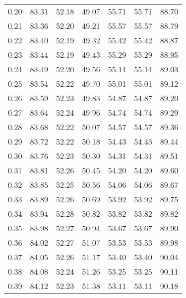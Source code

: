 \begin{tabular}{|c|c|c|c|c|c|c|}
      0.20 &     83.31 &     52.18 &      49.07 &   55.71 &      55.71 &         88.70 \\
      0.21 &     83.36 &     52.20 &      49.21 &   55.57 &      55.57 &         88.79 \\
      0.22 &     83.40 &     52.19 &      49.32 &   55.42 &      55.42 &         88.87 \\
      0.23 &     83.44 &     52.19 &      49.43 &   55.29 &      55.29 &         88.95 \\
      0.24 &     83.49 &     52.20 &      49.56 &   55.14 &      55.14 &         89.03 \\
      0.25 &     83.54 &     52.22 &      49.70 &   55.01 &      55.01 &         89.12 \\
      0.26 &     83.59 &     52.23 &      49.83 &   54.87 &      54.87 &         89.20 \\
      0.27 &     83.64 &     52.24 &      49.96 &   54.74 &      54.74 &         89.29 \\
      0.28 &     83.68 &     52.22 &      50.07 &   54.57 &      54.57 &         89.36 \\
      0.29 &     83.72 &     52.22 &      50.18 &   54.43 &      54.43 &         89.44 \\
      0.30 &     83.76 &     52.23 &      50.30 &   54.31 &      54.31 &         89.51 \\
      0.31 &     83.81 &     52.26 &      50.45 &   54.20 &      54.20 &         89.60 \\
      0.32 &     83.85 &     52.25 &      50.56 &   54.06 &      54.06 &         89.67 \\
      0.33 &     83.89 &     52.26 &      50.69 &   53.92 &      53.92 &         89.75 \\
      0.34 &     83.94 &     52.28 &      50.82 &   53.82 &      53.82 &         89.82 \\
      0.35 &     83.98 &     52.27 &      50.94 &   53.67 &      53.67 &         89.90 \\
      0.36 &     84.02 &     52.27 &      51.07 &   53.53 &      53.53 &         89.98 \\
      0.37 &     84.05 &     52.26 &      51.17 &   53.40 &      53.40 &         90.04 \\
      0.38 &     84.08 &     52.24 &      51.26 &   53.25 &      53.25 &         90.11 \\
      0.39 &     84.12 &     52.23 &      51.38 &   53.11 &      53.11 &         90.18 \\

\end{tabular}
